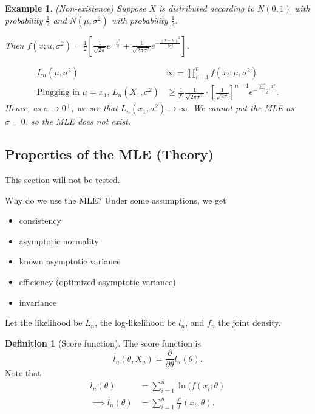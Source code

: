 \documentclass{tufte-handout}
\newtheorem{ex}[thm]{Example}
\theoremstyle{definition}
\newtheorem{defn}[thm]{Definition}
\begin{document}
\begin{ex}
	(Non-existence) Suppose $X$ is distributed according to $N(0,1)$ with probability $\frac{1}{2}$ and $N(\mu, \sigma^2)$ with probability $\frac{1}{2}$.

	Then $f(x; u, \sigma^2) = \frac{1}{2} \left[ \frac{1}{\sqrt{2\pi}}  e^{-\frac{x^2}{2}} + \frac{1}{\sqrt{2\pi \sigma^2} }e^{-\frac{(x-\mu)^2}{2\sigma^2}} \right] $.

	\begin{align*}
		L_n(\mu, \sigma^2) &\infty= \prod_{i=1}^{n} f(x_i; \mu, \sigma^2) \\ 
		\text{Plugging in $\mu = x_1$, } L_n(X_1, \sigma^2) &\ge \frac{1}{2^n} \frac{1}{\sqrt{2\pi\sigma^2} } \cdot \left[ \frac{1}{\sqrt{2\pi} } \right] ^{n-1} e^{-\frac{\sum\limits_{i=1}^{n} x_i^2}{2}}
	.\end{align*}
	Hence, as $\sigma \to 0^+$, we see that $L_n(x_1,\sigma^2) \to \infty$. We cannot put the MLE as $\hat{\sigma} = 0$, so the MLE does not exist.
\end{ex}

\subsection{Properties of the MLE (Theory)}

This section will not be tested.

Why do we use the MLE? Under some assumptions, we get
\begin{itemize}
	\item consistency
	\item asymptotic normality
	\item known asymptotic variance
	\item efficiency (optimized asymptotic variance)
	\item invariance
\end{itemize}

Let the likelihood be $L_n$, the log-likelihood be $l_n$, and $f_n$ the joint density.

\begin{defn}[Score function]
	The score function is \[
		\dot{l_n} (\theta, X_n) = \frac{\partial}{\partial\theta} l_n(\theta)
	.\] 
	Note that
	\begin{align*}
		l_n(\theta) &= \sum\limits_{i=1}^{n} \ln{(f(x_i;\theta)} \\
		\implies \dot{l_n}(\theta) &= \sum\limits_{i=1}^{n} \frac{f'}{f}(x_i, \theta)
	.\end{align*}
\end{defn}
\end{document}
